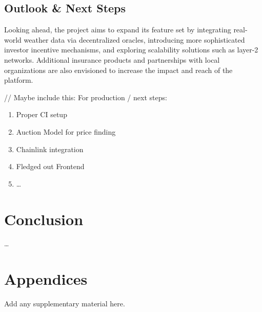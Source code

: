 \documentclass[11pt,a4paper]{article}
\begin{document}
    \subsection{Outlook \& Next Steps}\label{subsec:outlook}
    Looking ahead, the project aims to expand its feature set by integrating real-world weather data via decentralized oracles, introducing more sophisticated investor incentive mechanisms, and exploring scalability solutions such as layer-2 networks.
    Additional insurance products and partnerships with local organizations are also envisioned to increase the impact and reach of the platform.

     // Maybe include this:
    For production / next steps:
    \begin{enumerate}[1]
        \item Proper CI setup
        \item Auction Model for price finding
        \item Chainlink integration
        \item Fledged out Frontend
        \item \ldots
    \end{enumerate}


    \section{Conclusion}\label{sec:conclusion}
    \ldots

    \printbibliography

    \appendix
    \section*{Appendices}\label{sec:appendix}
    Add any supplementary material here.
\end{document}
